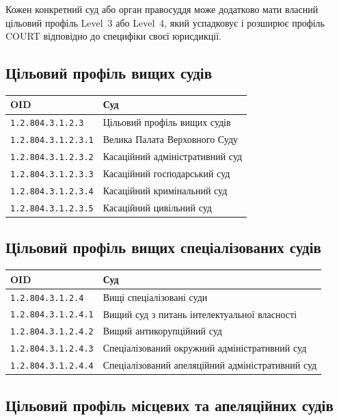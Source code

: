 Кожен конкретний суд або орган правосуддя може додатково мати власний цільовий
профіль Level~3 або Level~4, який успадковує і розширює профіль COURT відповідно
до специфіки своєї юрисдикції.

\subsection{Цільовий профіль вищих судів}

\begin{tabular}{ll}
\textbf{OID}                 & \textbf{Суд} \\
\hline
\texttt{1.2.804.3.1.2.3}     & Цільовий профіль вищих судів \\
\texttt{1.2.804.3.1.2.3.1}   & Велика Палата Верховного Суду \\
\texttt{1.2.804.3.1.2.3.2}   & Касаційний адміністративний суд \\
\texttt{1.2.804.3.1.2.3.3}   & Касаційний господарський суд \\
\texttt{1.2.804.3.1.2.3.4}   & Касаційний кримінальний суд \\
\texttt{1.2.804.3.1.2.3.5}   & Касаційний цивільний суд \\
\end{tabular}

\subsection{Цільовий профіль вищих спеціалізованих судів}

\begin{tabular}{ll}
\textbf{OID}                 & \textbf{Суд} \\
\hline
\texttt{1.2.804.3.1.2.4}     & Вищі спеціалізовані суди \\
\texttt{1.2.804.3.1.2.4.1}   & Вищий суд з питань інтелектуальної власності \\
\texttt{1.2.804.3.1.2.4.2}   & Вищий антикорупційний суд \\
\texttt{1.2.804.3.1.2.4.3}   & Спеціалізований окружний адміністративний суд \\
\texttt{1.2.804.3.1.2.4.4}   & Спеціалізований апеляційний адміністративний суд \\
\end{tabular}

\subsection{Цільовий профіль місцевих та апеляційних судів}

